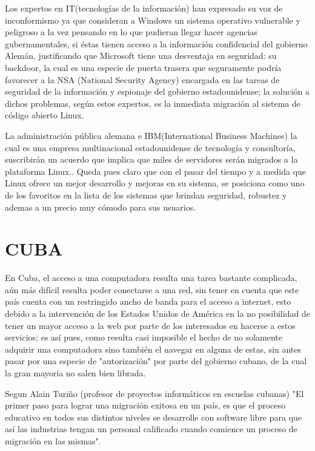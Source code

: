 Los expertos en IT(tecnologías de la información) han expresado su voz de inconformismo ya que consideran a Windows un sistema operativo vulnerable y peligroso a la vez pensando 
en lo que pudieran llegar hacer agencias gubernamentales, si éstas tienen acceso a la información confidencial del gobierno Alemán, justificando que Microsoft tiene una 
desventaja en seguridad: su backdoor, la cual es una especie de puerta trasera que seguramente podría favorecer a la NSA (National Security Agency) encargada en las tareas de 
seguridad de la información y espionaje del gobierno estadounidense; la solución a dichos problemas, según estos expertos, es la inmediata migración al sistema de código abierto 
Linux.                           
                                                                                                                                 
La administración pública alemana e IBM(International Business Machines) la cual es una empresa multinacional estadounidense de tecnología y consultoría, suscribirán un acuerdo 
que implica que miles de servidores serán migrados a la plataforma Linux.. Queda pues claro que con el pasar del tiempo y a medida que Linux ofrece un mejor desarrollo y mejoras 
en su sistema, se posiciona como uno de los favoritos en la lista de los sistemas que brindan seguridad, robustez y ademas a un precio muy cómodo para sus usuarios. 


\section*{CUBA}
En Cuba, el acceso a una computadora resulta una tarea bastante complicada, aún más difícil resulta poder conectarse a una red, sin tener en cuenta que este país cuenta con un 
restringido ancho de banda para el acceso a internet, esto debido a la intervención de los Estados Unidos de América en la no posibilidad de tener un mayor acceso a la web por 
parte de los interesados en hacerse a estos servicios; es así pues, como resulta casi imposible el hecho de no solamente adquirir una computadora sino también el navegar en 
alguna de estas, sin antes pasar por una especie de "autorización" por parte del gobierno cubano, de la cual la gran mayoría no salen bien librada.                                                                                                    

Segun Alain Turiño (profesor de proyectos informáticos en escuelas cubanas) "El primer paso para lograr una migración exitosa en un país, es que el proceso educativo en todos sus 
distintos niveles se desarrolle con software libre para que así las industrias tengan un personal calificado cuando comience un proceso de migración en las mismas".                                                 

